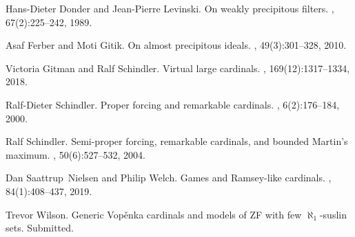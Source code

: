 \documentclass{amsart}
\theoremstyle{definition}
\begin{document}
%
%

\begin{thebibliography}{SNW19}

Hans-Dieter Donder and Jean-Pierre Levinski.
\newblock On weakly precipitous filters.
, 67(2):225--242, 1989.

Asaf Ferber and Moti Gitik.
\newblock On almost precipitous ideals.
, 49(3):301--328, 2010.

Victoria Gitman and Ralf Schindler.
\newblock Virtual large cardinals.
, 169(12):1317--1334, 2018.

Ralf-Dieter Schindler.
\newblock Proper forcing and remarkable cardinals.
, 6(2):176--184, 2000.

Ralf Schindler.
\newblock Semi-proper forcing, remarkable cardinals, and bounded {M}artin's
  maximum.
, 50(6):527--532, 2004.

Dan Saattrup~Nielsen and Philip Welch.
\newblock Games and {R}amsey-like cardinals.
, 84(1):408--437, 2019.

Trevor Wilson.
\newblock Generic {V}op\v enka cardinals and models of {ZF} with few
  {$\aleph_1$}-suslin sets.
\newblock Submitted.

\end{thebibliography}

\fi 
\end{document}
